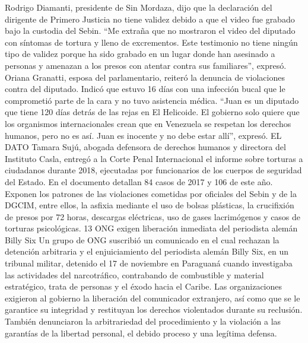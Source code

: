 \documentclass{article}%
\begin{document}
\newline%
%
Rodrigo Diamanti, presidente de Sin Mordaza, dijo que la declaración del dirigente de Primero Justicia no tiene validez debido a que el video fue grabado bajo la custodia del Sebin.%
\newline%
%
“Me extraña que no mostraron el video del diputado con síntomas de tortura y lleno de excrementos. Este testimonio no tiene ningún tipo de validez porque ha sido grabado en un lugar donde han asesinado a personas y amenazan a los presos con atentar contra sus familiares”, expresó.%
\newline%
%
Oriana Granatti, esposa del parlamentario, reiteró la denuncia de violaciones contra del diputado. Indicó que estuvo 16 días con una infección bucal que le comprometió parte de la cara y no tuvo asistencia médica. “Juan es un diputado que tiene 120 días detrás de las rejas en El Helicoide. El gobierno solo quiere que los organismos internacionales crean que en Venezuela se respetan los derechos humanos, pero no es así. Juan es inocente y no debe estar allí”, expresó.%
\newline%
%
EL DATO%
\newline%
%
Tamara Sujú, abogada defensora de derechos humanos y directora del Instituto Casla, entregó a la Corte Penal Internacional el informe sobre torturas a ciudadanos durante 2018, ejecutadas por funcionarios de los cuerpos de seguridad del Estado. En el documento detallan 84 casos de 2017 y 106 de este año. Exponen los patrones de las violaciones cometidas por oficiales del Sebin y de la DGCIM, entre ellos, la asfixia mediante el uso de bolsas plásticas, la crucifixión de presos por 72 horas, descargas eléctricas, uso de gases lacrimógenos y casos de torturas psicológicas.%
\newline%
%
13 ONG exigen liberación inmediata del periodista alemán Billy Six%
\newline%
%
Un grupo de ONG suscribió un comunicado en el cual rechazan la detención arbitraria y el enjuiciamiento del periodista alemán Billy Six, en un tribunal militar, detenido el 17 de noviembre en Paraguaná cuando investigaba las actividades del narcotráfico, contrabando de combustible y material estratégico, trata de personas y el éxodo hacia el Caribe.%
\newline%
%
Las organizaciones exigieron al gobierno la liberación del comunicador extranjero, así como que se le garantice su integridad y restituyan los derechos violentados durante su reclusión. También denunciaron la arbitrariedad del procedimiento y la violación a las garantías de la libertad personal, el debido proceso y una legítima defensa.%
\end{document}
